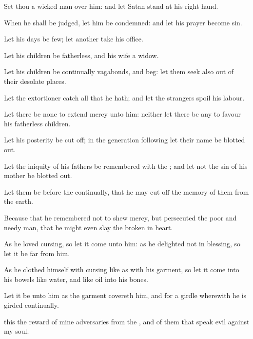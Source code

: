 {\Q {}Set thou a wicked
man over him: and let
Satan
stand at his right
hand.


\par }{\Q {}When he shall be
judged, let him
be
condemned: and let his
prayer become
sin.


\par }{\Q {}Let his
days be
few;
{} let
another
take his
office.


\par }{\Q {}Let his
children be
fatherless, and his
wife a
widow.


\par }{\Q {}Let his
children be
continually
vagabonds, and
beg: let them
seek
{} also out of their desolate
places.


\par }{\Q {}Let the
extortioner
catch all that he hath; and let the
strangers
spoil his
labour.


\par }{\Q {}Let there be none to
extend
mercy unto him: neither let there be any to
favour his fatherless
children.


\par }{\Q {}Let his
posterity be cut
off;
{} in the
generation
following let their
name be blotted
out.


\par }{\Q {}Let the
iniquity of his
fathers be
remembered with the
{}; and let not the
sin of his
mother be blotted
out.


\par }{\Q {}Let them be before the
{}
continually, that he may cut
off the
memory of them from the
earth.


\par }{\Q {}Because that he
remembered not to
shew
mercy, but
persecuted the
poor and
needy
man, that he might even
slay the
broken in
heart.


\par }{\Q {}As he
loved
cursing, so let it
come unto him: as he
delighted not in
blessing, so let it be
far from him.


\par }{\Q {}As he
clothed himself with
cursing like as with his
garment, so let it
come into his
bowels like
water, and like
oil into his
bones.


\par }{\Q {}Let it be unto him as the
garment
{}
covereth him, and for a
girdle wherewith he is
girded
continually.


\par }{\Q {} this
{} the
reward of mine
adversaries from the
{}, and of them that
speak
evil against my
soul.


\par }{\BB \par }
